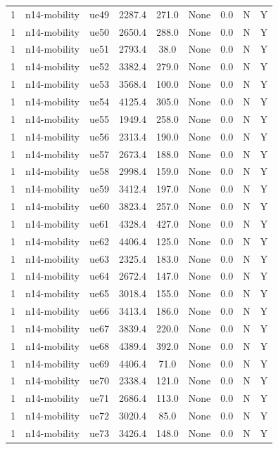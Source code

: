 \begin{table}[ht]
\begin{tabular}{|c|c|c|c|c|c|c|c|c|}
1 & n14-mobility & ue49 & 2287.4 & 271.0 & None & 0.0 & N & Y \\
1 & n14-mobility & ue50 & 2650.4 & 288.0 & None & 0.0 & N & Y \\
1 & n14-mobility & ue51 & 2793.4 & 38.0 & None & 0.0 & N & Y \\
1 & n14-mobility & ue52 & 3382.4 & 279.0 & None & 0.0 & N & Y \\
1 & n14-mobility & ue53 & 3568.4 & 100.0 & None & 0.0 & N & Y \\
1 & n14-mobility & ue54 & 4125.4 & 305.0 & None & 0.0 & N & Y \\
1 & n14-mobility & ue55 & 1949.4 & 258.0 & None & 0.0 & N & Y \\
1 & n14-mobility & ue56 & 2313.4 & 190.0 & None & 0.0 & N & Y \\
1 & n14-mobility & ue57 & 2673.4 & 188.0 & None & 0.0 & N & Y \\
1 & n14-mobility & ue58 & 2998.4 & 159.0 & None & 0.0 & N & Y \\
1 & n14-mobility & ue59 & 3412.4 & 197.0 & None & 0.0 & N & Y \\
1 & n14-mobility & ue60 & 3823.4 & 257.0 & None & 0.0 & N & Y \\
1 & n14-mobility & ue61 & 4328.4 & 427.0 & None & 0.0 & N & Y \\
1 & n14-mobility & ue62 & 4406.4 & 125.0 & None & 0.0 & N & Y \\
1 & n14-mobility & ue63 & 2325.4 & 183.0 & None & 0.0 & N & Y \\
1 & n14-mobility & ue64 & 2672.4 & 147.0 & None & 0.0 & N & Y \\
1 & n14-mobility & ue65 & 3018.4 & 155.0 & None & 0.0 & N & Y \\
1 & n14-mobility & ue66 & 3413.4 & 186.0 & None & 0.0 & N & Y \\
1 & n14-mobility & ue67 & 3839.4 & 220.0 & None & 0.0 & N & Y \\
1 & n14-mobility & ue68 & 4389.4 & 392.0 & None & 0.0 & N & Y \\
1 & n14-mobility & ue69 & 4406.4 & 71.0 & None & 0.0 & N & Y \\
1 & n14-mobility & ue70 & 2338.4 & 121.0 & None & 0.0 & N & Y \\
1 & n14-mobility & ue71 & 2686.4 & 113.0 & None & 0.0 & N & Y \\
1 & n14-mobility & ue72 & 3020.4 & 85.0 & None & 0.0 & N & Y \\
1 & n14-mobility & ue73 & 3426.4 & 148.0 & None & 0.0 & N & Y \\

\end{tabular}
\end{table}
